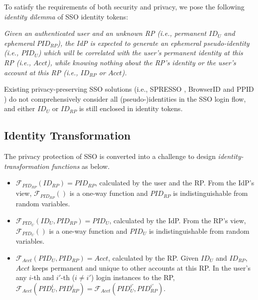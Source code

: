 To satisfy the requirements of both security and privacy,
     we pose the following \emph{identity dilemma} of SSO identity tokens:

\noindent\emph{Given an authenticated user and an unknown RP (i.e., permanent $ID_U$ and ephemeral $PID_{RP}$),
    the IdP is expected to generate an ephemeral pseudo-identity (i.e., $PID_{U}$)
     which will be correlated with the user's permanent identity at this RP (i.e., $Acct$),
     while knowing nothing about the RP's identity or the user's account at this RP (i.e., $ID_{RP}$ or $Acct$).}

Existing privacy-preserving SSO solutions (i.e., SPRESSO \cite{SPRESSO}, BrowserID \cite{BrowserID} and PPID \cite{NIST2017draft})
  do not comprehensively consider all (pseudo-)identities in the SSO login flow,
    and either $ID_U$ or $ID_{RP}$ is still enclosed in identity tokens.


\subsection{Identity Transformation}
\label{subsec:solutions}



The privacy protection of SSO is converted into a challenge
 to design \emph{identity-transformation functions} as below.
\vspace{-\topsep}\begin{itemize}
\setlength{\topsep}{0pt}
\setlength{\partopsep}{0pt}
\setlength{\itemsep}{0pt}
\setlength{\parsep}{0pt}
\setlength{\parskip}{0pt}
\item
$\mathcal{F}_{PID_{RP}}(ID_{RP}) = PID_{RP}$, calculated by the user and the RP.
From the IdP's view,
$\mathcal{F}_{PID_{RP}}()$ is a one-way function and $PID_{RP}$
is indistinguishable from random variables.
\item
$\mathcal{F}_{PID_U}(ID_U, PID_{RP}) = PID_{U}$, calculated by the IdP.
From the RP's view,
    $\mathcal{F}_{PID_U}()$ is a one-way function and $PID_{U}$ is indistinguishable from random variables.
\item
$\mathcal{F}_{Acct}(PID_{U}, PID_{RP}) = Acct$, calculated by the RP.
Given $ID_U$ and $ID_{RP}$, $Acct$ keeps permanent and unique to other accounts at this RP.
In the user's any $i$-th and $i'$-th ($i \neq i'$) login instances to the RP,
 $\mathcal{F}_{Acct}(PID_{U}^i, PID_{RP}^i) = \mathcal{F}_{Acct}(PID_{U}^{i'}, PID_{RP}^{i'})$.
\end{itemize}

